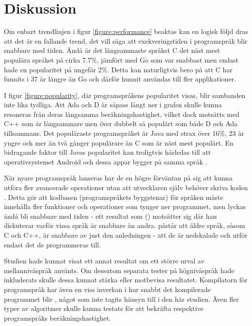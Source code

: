 \documentclass[12pt,swedish]{article}
\begin{document}
\section{Diskussion}
Om enbart trendlinjen i figur \ref{figure:performance} beaktas kan en logisk följd dras att det är en fallande trend, det vill säga att exekveringstiden i programspråk blir snabbare med tiden. Ändå är det långsammaste språket C det näst mest populära språket på cirka 7.7\%, jämfört med Go som var snabbast men endast hade en popularitet på ungefär 2\%. Detta kan naturligtvis bero på att C har funnits i 37 år längre än Go och därför hunnit användas till fler applikationer.

I figur \ref{figure:popularity}, där programspråkens popularitet visas, blir sambanden inte lika tydliga. Att Ada och D är såpass långt ner i grafen skulle kunna resoneras från deras långsamma beräkningshastighet, vilket dock motsätts med C++ som är långsammare men över dubbelt så populärt som både D och Ada tillsammans. Det populäraste programspråket är Java med strax över 16\%, 23 år yngre och mer än två gånger populärare än C som är näst mest populärt. En bidragande faktor till Javas popularitet kan troligtvis härledas till att operativsystemet Android och dessa appar bygger på samma språk \citep{gruman_2017}.

När nyare programspråk lanseras har de en högre förväntan på sig att kunna utföra fler avancerade operationer utan att utvecklaren själv behöver skriva koden \citep{stroustrup_1997}. Detta gör att kodbasen (programspråkets byggstenar) för språken måste innehålla fler funktioner och operationer som tynger ner programmet, men lyckas ändå bli snabbare med tiden - ett resultat som  \citeauthor{luong_2017} (\citeyear{luong_2017}) motsätter sig där han diskuterar varför vissa språk är snabbare än andra. \citeauthor{luong_2017} påstår att äldre språk, såsom C och C++, är snabbare av just den anledningen - att de är nedskalade och utför endast det de programmeras till.

Studien hade kunnat visat ett annat resultat om ett större urval av mellannivåspråk använts. Om dessutom separata tester på högnivåspråk hade inkluderats skulle dessa kunnat stärka eller motbevisa resultatet. Kompilatorn för programspråk har även en viss inverkan i hur snabbt det kompilerade programmet blir \citep{srikant_shankar_2008}, något som inte tagits hänsyn till i den här studien. Även fler typer av algoritmer skulle kunna testats för att bekräfta respektive programspråks beräkningshastighet.
\end{document}
